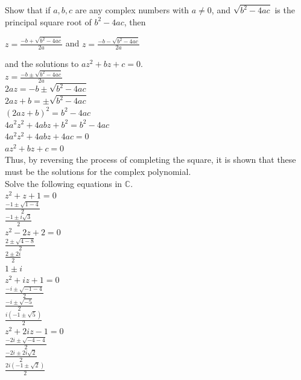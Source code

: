 \documentclass[12pt]{article}
\begin{document}
 Show that if $a,b,c$ are any complex numbers with $a \neq 0$, and $\sqrt{b^2 - 4ac}$ is the principal square root of $b^2 - 4ac$, then\\
\begin{center}
	$z = \frac{-b + \sqrt{b^2 - 4ac}}{2a}$ 
	and
	$z = \frac{-b - \sqrt{b^2 - 4ac}}{2a}$
\end{center}
and the solutions to $az^2 + bz + c = 0$.\\


$z = \frac{-b \pm \sqrt{b^2 - 4ac}}{2a}$\\ 
$2az = -b \pm \sqrt{b^2 - 4ac}$\\ 
$2az + b = \pm \sqrt{b^2 - 4ac}$\\ 
$(2az + b)^2 = b^2 - 4ac$\\ 
$4a^2z^2 + 4abz + b^2 = b^2 - 4ac$\\ 
$4a^2z^2 + 4abz + 4ac = 0$\\ 
$az^2 + bz + c = 0$\\

Thus, by reversing the process of completing the square, it is shown that these must be the solutions for the complex polynomial.\\


 Solve the following equations in $\mathbb{C}$.\\


 $z^2 + z + 1 = 0$\\

$\frac{-1 \pm \sqrt{1-4}}{2}$\\
$\frac{-1 \pm i\sqrt{3}}{2}$\\


 $z^2 - 2z + 2 = 0$\\

$\frac{2 \pm \sqrt{4 - 8}}{2}$\\
$\frac{2 \pm 2i}{2}$\\
$1 \pm i$\\


 $z^2 + iz + 1 = 0$\\

$\frac{-i \pm \sqrt{-1 - 4}}{2}$\\
$\frac{-i \pm \sqrt{-5}}{2}$\\
$\frac{i(-1 \pm \sqrt{5})}{2}$\\


 $z^2 + 2iz - 1 = 0$\\

$\frac{-2i \pm \sqrt{-4 - 4}}{2}$\\
$\frac{-2i \pm 2i\sqrt{2}}{2}$\\
$\frac{2i(-1 \pm \sqrt{2})}{2}$\\
\end{document}
